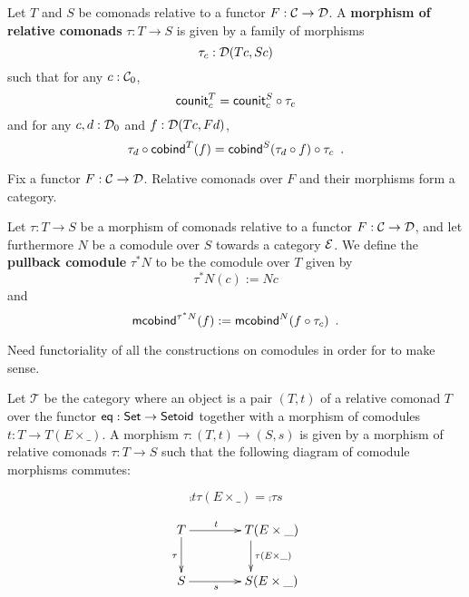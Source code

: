 \documentclass{amsart}
\newcommand{\fat}[1]{\textbf{#1}}
\begin{document}
\begin{definition}
 Let $T$ and $S$ be comonads relative to a functor $F : \C \to \D$. A \fat{morphism of relative comonads} $\tau : T \to S$
  is given by a family of morphisms \[\tau_c : \D(Tc,Sc)\] such that for any $c : \C_0$,
     \[  \counit^T_c = \comp{\tau_c}{\counit^S_c} \]
   and for any $c,d : \D_0$ and $f : \D(Tc,Fd)$,
   \[  \comp{\cobind^T(f)}{\tau_d} = \comp{\tau_c}{\cobind^S(\comp{f}{\tau_d})} \enspace .  \]
\end{definition}

\begin{remark}
 Fix a functor $F : \C\to\D$. Relative comonads over $F$ and their morphisms form a category.
\end{remark}


\begin{definition}
  Let $\tau : T\to S$ be a morphism of comonads relative to a functor $F : \C \to \D$, and let furthermore $N$ be a 
  comodule over $S$ towards a category $\E$. We define the \fat{pullback comodule} $\tau^*N$ to be the comodule over $T$ given by
  \[  \tau^*N(c) := Nc \]
  and 
   \[ \mcobind^{\tau^*N}(f) := \mcobind^N(\comp{\tau_c}{f}) \enspace . \]
\end{definition}

Need functoriality of all the constructions on comodules in order for  to make sense.

\begin{example}\label{ex:final_sem_tri}
   Let $\mathcal{T}$ be the category where an object is a pair $(T,t)$ of a relative comonad $T$ over the functor
   $\eq: \Set \to \Setoid$ together with a morphism of comodules $t : T \to T(E \times \_)$.
   A morphism $\tau : (T,t) \to (S,s)$ is given by a morphism of relative comonads $\tau : T \to S$ such that
   the following diagram of comodule morphisms commutes:
   
   \[     \comp{t}{\tau(E\times \_)} = \comp{\tau}{s} \]
   
   \[ \begin{xy}
       \xymatrix{   T  \ar[r]^t \ar[d]_{\tau}  &  **[r]T (E\times \_ )\ar[d]^{\tau(E\times \_)} \\
                    S  \ar[r]_s  &  **[r]S (E\times \_ )
        }
      \end{xy}
   \]

   
\end{example}


\end{document}
